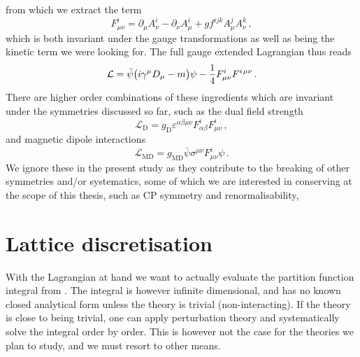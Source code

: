 %
from which we extract the term
%
\begin{equation} \label{eq:field_strength}
  F_{\mu\nu}^i = \partial_{\mu} A^i_{\nu} - \partial_{\nu}
    A^i_{\mu} + g f^{ijk} A^j_{\mu} A^k_{\nu} \,,
\end{equation}
%
which is both invariant under the gauge transformations as well as being the
kinetic term we were looking for. The full gauge extended Lagrangian thus
reads
%
\begin{equation} \label{eq:gauge_lagrangian}
  \mathcal{L} = \bar{\psi}\big(i \gamma^{\mu} D_{\mu} - m\big)\psi 
    - \frac{1}{4} F^i_{\mu\nu} F^{i\hskip.2ex\mu\nu} \,.
\end{equation}
%
There are higher order combinations of these ingredients which are invariant
under the symmetries discussed so far, such as the dual field strength
%
\begin{equation}
  \mathcal{L}_{\mathrm{D}} = g_{\mathrm{D}} \varepsilon^{\alpha\beta\mu\nu}
    F^i_{\alpha\beta} F^i_{\mu\nu}\,,
\end{equation}
%
and magnetic dipole interactions
%
\begin{equation}
  \mathcal{L}_{\mathrm{MD}} = g_{\mathrm{MD}} \bar{\psi} \sigma^{\mu\nu} F^i_{\mu\nu} \psi\,.
\end{equation}
%
We ignore these in the present study as they contribute to the breaking of other
symmetries and/or systematics, some of which we are interested in conserving at
the scope of this thesis, such as CP symmetry and renormalisability,

\section{Lattice discretisation} \label{sec:lattice_intro}

With the Lagrangian at hand we want to actually evaluate the partition function
integral from . The integral is however infinite
dimensional, and has no known closed analytical form unless the theory is
trivial (non-interacting). If the theory is close to being trivial, one can
apply perturbation theory and systematically solve the integral order by order.
This is however not the case for the theories we plan to study, and we must
resort to other means.


